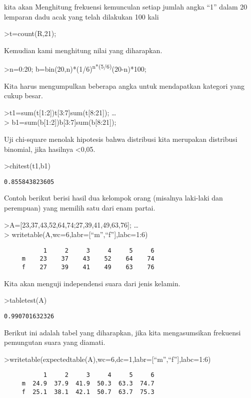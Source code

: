 \documentclass[
]{book}
\begin{document}
kita akan Menghitung frekuensi kemunculan setiap jumlah angka ``1'' dalam 20 lemparan dadu acak yang telah dilakukan 100 kali

\textgreater t=count(R,21);

Kemudian kami menghitung nilai yang diharapkan.

\textgreater n=0:20; b=bin(20,n)*(1/6)\textsuperscript{n*(5/6)}(20-n)*100;

Kita harus mengumpulkan beberapa angka untuk mendapatkan kategori yang cukup besar.

\textgreater t1=sum(t{[}1:2{]})\textbar t{[}3:7{]}\textbar sum(t{[}8:21{]}); \ldots{}\\
\textgreater{} b1=sum(b{[}1:2{]})\textbar b{[}3:7{]}\textbar sum(b{[}8:21{]});

Uji chi-square menolak hipotesis bahwa distribusi kita merupakan distribusi binomial, jika hasilnya \textless0,05.

\textgreater chitest(t1,b1)

\begin{verbatim}
0.855843823605
\end{verbatim}

Contoh berikut berisi hasil dua kelompok orang (misalnya laki-laki dan perempuan) yang memilih satu dari enam partai.

\textgreater A={[}23,37,43,52,64,74;27,39,41,49,63,76{]}; \ldots{}\\
\textgreater{} writetable(A,wc=6,labr={[}``m'',``f''{]},labc=1:6)

\begin{verbatim}
           1     2     3     4     5     6
     m    23    37    43    52    64    74
     f    27    39    41    49    63    76
\end{verbatim}

Kita akan menguji independensi suara dari jenis kelamin.

\textgreater tabletest(A)

\begin{verbatim}
0.990701632326
\end{verbatim}

Berikut ini adalah tabel yang diharapkan, jika kita mengasumsikan frekuensi pemungutan suara yang diamati.

\textgreater writetable(expectedtable(A),wc=6,dc=1,labr={[}``m'',``f''{]},labc=1:6)

\begin{verbatim}
           1     2     3     4     5     6
     m  24.9  37.9  41.9  50.3  63.3  74.7
     f  25.1  38.1  42.1  50.7  63.7  75.3
\end{verbatim}
\end{document}

